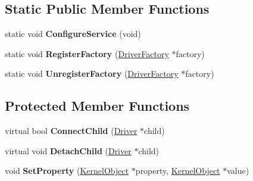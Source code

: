 \subsection*{Static Public Member Functions}
\begin{DoxyCompactItemize}
\item 
\mbox{\label{class_driver_ad97bd656791f23dd5ae7c3a8029d3b31}} 
static void {\bfseries Configure\+Service} (void)
\item 
\mbox{\label{class_driver_a4d57c158b21441adeeeeec3994674746}} 
static void {\bfseries Register\+Factory} (\hyperlink{class_driver_factory}{Driver\+Factory} $\ast$factory)
\item 
\mbox{\label{class_driver_a3996984bc55f3c550b9a3d82673382e0}} 
static void {\bfseries Unregister\+Factory} (\hyperlink{class_driver_factory}{Driver\+Factory} $\ast$factory)
\end{DoxyCompactItemize}
\subsection*{Protected Member Functions}
\begin{DoxyCompactItemize}
\item 
\mbox{\label{class_driver_a7688e9808028a867736f42aff745ba56}} 
virtual bool {\bfseries Connect\+Child} (\hyperlink{class_driver}{Driver} $\ast$child)
\item 
\mbox{\label{class_driver_a7d2bbb830c6059effcfe05cc6e2e0862}} 
virtual void {\bfseries Detach\+Child} (\hyperlink{class_driver}{Driver} $\ast$child)
\item 
\mbox{\label{class_driver_a12e96593446af8b1c55b972a2c3fa500}} 
void {\bfseries Set\+Property} (\hyperlink{class_kernel_object}{Kernel\+Object} $\ast$property, \hyperlink{class_kernel_object}{Kernel\+Object} $\ast$value)
\end{DoxyCompactItemize}
